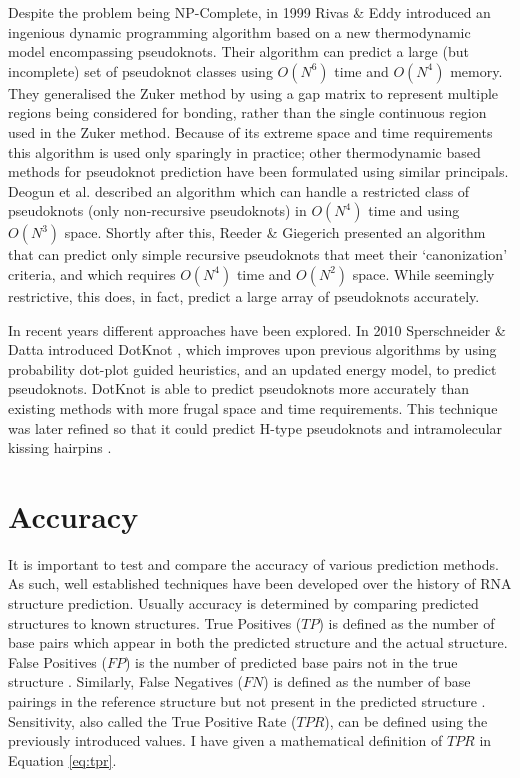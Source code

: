 \documentclass{cshonours}
\begin{document}
Despite the problem being NP-Complete, in 1999 Rivas \& Eddy \cite{rivas1999dynamic} introduced an ingenious dynamic
programming algorithm based on a new thermodynamic model encompassing pseudoknots. Their algorithm can predict a large (but incomplete) set of pseudoknot classes using
$O(N^6)$ time and $O(N^4)$ memory. They generalised the Zuker method by using a gap matrix to represent multiple regions being considered for bonding, rather than
the single continuous region used in the Zuker method. Because of its extreme
space and time requirements this algorithm is used only sparingly in practice; other thermodynamic based methods for pseudoknot prediction have
been formulated using similar principals. Deogun et al. \cite{deogun2004rna} described an algorithm which can handle a restricted class of pseudoknots (only non-recursive pseudoknots) in $O(N^4)$ time and using $O(N^3)$ space. Shortly after this, Reeder \& Giegerich \cite{reeder2004design} presented an algorithm that can predict
only simple recursive pseudoknots that meet their `canonization' criteria, and which requires $O(N^4)$ time and $O(N^2)$ space. While
seemingly restrictive, this does, in fact, predict a large array of pseudoknots accurately. 

In recent years different approaches have been explored. In 2010 Sperschneider \& Datta introduced DotKnot \cite{sperschneider2010dotknot}, which improves upon previous algorithms by using probability dot-plot guided heuristics, and an updated energy model, to predict pseudoknots. DotKnot is able to predict pseudoknots more accurately than existing methods with more frugal space and time requirements. This technique was later refined so that it could predict H-type pseudoknots and intramolecular kissing hairpins \cite{sperschneider2011heuristic}.


\section{Accuracy}
\label{sec:accuracy}
It is important to test and compare the accuracy of various prediction methods.
As such, well established techniques have been developed over
the history of RNA structure prediction. Usually accuracy is determined by comparing predicted structures to known
structures. True Positives ($TP$) is defined as the number of base pairs which appear in both the predicted structure and the actual structure. False Positives
($FP$) is the number of predicted base pairs not in the true
structure \cite{lorenz2011viennarna}. Similarly, False Negatives ($FN$) is defined as the number of base
pairings in the reference structure but not present in the predicted structure \cite{lorenz2011viennarna}.
Sensitivity, also called the True Positive Rate ($TPR$), can be defined using the previously introduced values. I have given a mathematical definition of $TPR$ in Equation \ref{eq:tpr}.
\end{document}
